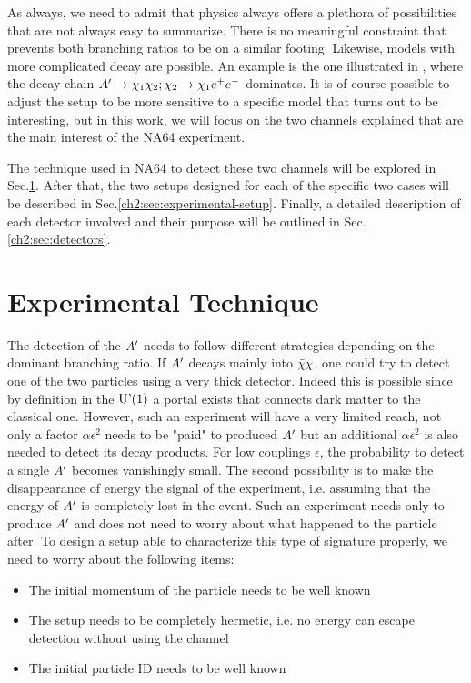 As always, we need to admit that physics always offers a plethora of possibilities that are not always easy to summarize. There is no meaningful constraint that prevents both branching ratios to be on a similar footing. Likewise, models with more complicated decay are possible. An example is the one illustrated in \cite{Mohlabeng_2019}, where the decay chain $A' \to \chi_1 \chi_2; \chi_2 \to \chi_1 e^+e^-$ dominates. It is of course possible to adjust the setup to be more sensitive to a specific model that turns out to be interesting, but in this work, we will focus on the two channels explained that are the main interest of the NA64 experiment.

The technique used in NA64 to detect these two channels will be explored in Sec.\ref{ch2:sec:experimental-technique}. After that, the two setups designed for each of the specific two cases will be described in Sec.\ref{ch2:sec:experimental-setup}. Finally, a detailed description of each detector involved and their purpose will be outlined in Sec.\ref{ch2:sec:detectors}.


\section{Experimental Technique}
\label{ch2:sec:experimental-technique}

The detection of the $A'$ needs to follow different strategies depending on the dominant branching ratio. If $A'$ decays mainly into $\bar{\chi} \chi$, one could try to detect one of the two particles using a very thick detector. Indeed this is possible since by definition in the $\textrm{U'(1)}$ a portal exists that connects dark matter to the classical one. However, such an experiment will have a very limited reach, not only a factor $\alpha \epsilon^2$ needs to be "paid" to produced $A'$ but an additional $\alpha \epsilon^2$ is also needed to detect its decay products. For low couplings $\epsilon$, the probability to detect a single $A'$ becomes vanishingly small. The second possibility is to make the disappearance of energy the signal of the experiment, i.e. assuming that the energy of $A'$ is completely lost in the event. Such an experiment needs only to produce $A'$ and does not need to worry about what happened to the particle after. To design a setup able to characterize this type of signature properly, we need to worry about the following items:

\begin{itemize}
\item The initial momentum of the particle needs to be well known
\item The setup needs to be completely hermetic, i.e. no energy can escape detection without using the channel 
\item The initial particle ID needs to be well known
\end{itemize}

